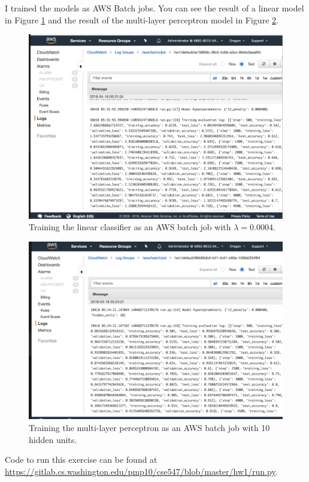 \documentclass[letterpaper,11pt]{article}
\begin{document}
I trained the models as AWS Batch jobs. You can see the result of a linear model
in Figure \ref{fig:linear_batch} and the result of the multi-layer perceptron
model in Figure \ref{fig:mlp_batch}.

\begin{figure}
  \includegraphics[width=\textwidth]{linear_screenshot.png}
  \caption{Training the linear classifier as an AWS batch job with $\lambda = 0.0004$.}
  \label{fig:linear_batch}
\end{figure}

\begin{figure}
  \includegraphics[width=\textwidth]{mlp_10_screenshot.png}
  \caption{Training the multi-layer perceptron as an AWS batch job with 10 hidden units.}
  \label{fig:mlp_batch}
\end{figure}

Code to run this exercise can be found at \url{https://gitlab.cs.washington.edu/pmp10/cse547/blob/master/hw1/run.py}.
\end{document}
